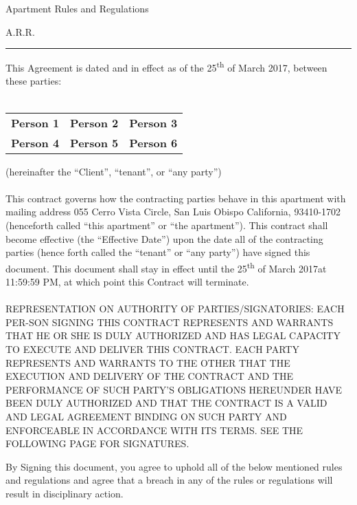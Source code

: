 \documentclass[10pt]{article}
\newcommand{\dateEffective}{25\textsuperscript {th} of March 2017}
\newcommand{\dateNullification}{25\textsuperscript {th} of March 2017}
\newcommand{\personOne}{Person 1}
\newcommand{\personTwo}{Person 2}
\newcommand{\personThree}{Person 3}
\newcommand{\personFour}{Person 4}
\newcommand{\personFive}{Person 5}
\newcommand{\personSix}{Person 6}
\begin{document}
	\begin{center}
		{\Large Apartment Rules and Regulations}
	\end{center}
\begin{center}
	
	{\normalsize  A.R.R.}
\end{center}
\hrule height .1mm

\vspace{.5cm}

\noindent This Agreement is dated and in effect as of the \dateEffective, between these parties:\\
\\
\begin{center}
	\begin{tabular}{ c c c }
		{\bf \personOne} & {\bf \personTwo} & {\bf \personThree}\\
		{\bf {\bf \personFour}} & {\bf \personFive} & {\bf \personSix}
	\end{tabular}
\end{center}

\noindent (hereinafter the ``Client'', ``tenant'', or ``any party'')\\ \\

\noindent This contract governs how the contracting parties behave in this apartment with mailing address 055 Cerro Vista Circle, San Luis Obispo California, 93410-1702 (henceforth called ``this apartment'' or ``the apartment''). This contract shall become effective (the ``Effective Date'') upon the date all of the contracting parties (hence forth called the ``tenant'' or ``any party'') have signed this document. This document shall stay in effect until the \dateNullification\space at 11:59:59 PM, at which point this Contract will terminate.
\\ \\
\noindent REPRESENTATION ON AUTHORITY OF PARTIES/SIGNATORIES: EACH PER-SON SIGNING THIS CONTRACT REPRESENTS AND WARRANTS THAT HE OR SHE IS DULY AUTHORIZED AND HAS LEGAL CAPACITY TO EXECUTE AND DELIVER THIS CONTRACT. EACH PARTY REPRESENTS AND WARRANTS TO THE OTHER THAT THE EXECUTION AND DELIVERY OF THE CONTRACT AND THE PERFORMANCE OF SUCH PARTY’S OBLIGATIONS HEREUNDER HAVE BEEN DULY AUTHORIZED AND THAT THE CONTRACT IS A VALID AND LEGAL AGREEMENT BINDING ON SUCH PARTY AND ENFORCEABLE IN ACCORDANCE WITH ITS TERMS. SEE THE FOLLOWING PAGE FOR SIGNATURES.

\newpage
\noindent By Signing this document, you agree to uphold all of the below mentioned rules and regulations and agree that a breach in any of the rules or regulations will result in disciplinary action.
\def\s#1#2{\vbox{\hsize=4.5cm
		\kern2cm
		\hrule\kern1ex
		\hbox to \hsize{\strut\hfil #1 \hfil}
		\hbox to \hsize{\strut\hfil #2 \hfil}}}
\end{document}
